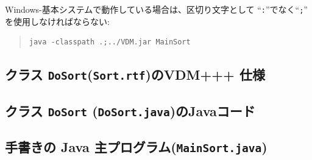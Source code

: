 \documentclass[\pformat,11pt]{jarticle}
\begin{document}
Windows-基本システムで動作している場合は、区切り文字として ``{\tt :}''でなく``{\tt ;}'' を使用しなければならない:

\begin{quote}
\begin{verbatim}
java -classpath .;../VDM.jar MainSort
\end{verbatim}
\end{quote}

\subsection{クラス \texttt{DoSort}(\texttt{Sort.rtf})のVDM+++ 仕様}
\label{sec:vdmDoSort}

\subsection{クラス \texttt{DoSort} (\texttt{DoSort.java})のJavaコード}
\label{sec:javaDoSort}
\begin{small}
\end{small}

\subsection{手書きの Java 主プログラム(\texttt{MainSort.java})}
\label{sec:main}
\end{document}
